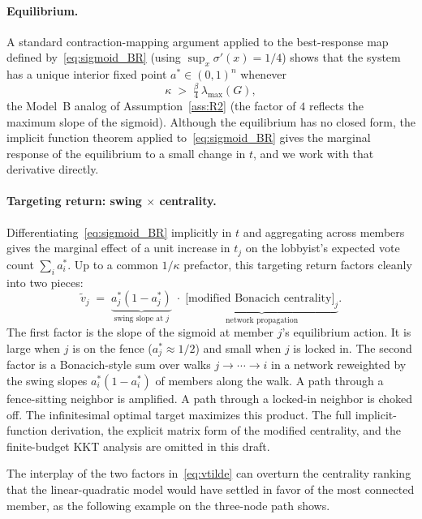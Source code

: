 \documentclass[11pt,letterpaper]{article}
\theoremstyle{plain}
\theoremstyle{definition}
\theoremstyle{remark}
\begin{document}
\paragraph{Equilibrium.} A standard contraction-mapping argument applied to the best-response map defined by~\eqref{eq:sigmoid_BR} (using $\sup_x \sigma'(x) = 1/4$) shows that the system has a unique interior fixed point $a^* \in (0,1)^n$ whenever
\begin{equation}
\kappa \;>\; \tfrac{\beta}{4}\, \lambda_{\max}(G),
\label{eq:spectral_B}
\end{equation}
the Model~B analog of Assumption~\ref{ass:R2} (the factor of $4$ reflects the maximum slope of the sigmoid). Although the equilibrium has no closed form, the implicit function theorem applied to~\eqref{eq:sigmoid_BR} gives the marginal response of the equilibrium to a small change in $t$, and we work with that derivative directly.

\paragraph{Targeting return: swing $\times$ centrality.} Differentiating~\eqref{eq:sigmoid_BR} implicitly in $t$ and aggregating across members gives the marginal effect of a unit increase in $t_j$ on the lobbyist's expected vote count $\sum_i a_i^*$. Up to a common $1/\kappa$ prefactor, this targeting return factors cleanly into two pieces:
\begin{equation}
\tilde v_j \;=\; \underbrace{a_j^*(1 - a_j^*)}_{\text{swing slope at }j} \;\cdot\; \underbrace{\bigl[\text{modified Bonacich centrality}\bigr]_j}_{\text{network propagation}}.
\label{eq:vtilde}
\end{equation}
The first factor is the slope of the sigmoid at member $j$'s equilibrium action. It is large when $j$ is on the fence ($a_j^* \approx 1/2$) and small when $j$ is locked in. The second factor is a Bonacich-style sum over walks $j \to \cdots \to i$ in a network reweighted by the swing slopes $a_i^*(1 - a_i^*)$ of members along the walk. A path through a fence-sitting neighbor is amplified. A path through a locked-in neighbor is choked off. The infinitesimal optimal target maximizes this product. The full implicit-function derivation, the explicit matrix form of the modified centrality, and the finite-budget KKT analysis are omitted in this draft.

The interplay of the two factors in~\eqref{eq:vtilde} can overturn the centrality ranking that the linear-quadratic model would have settled in favor of the most connected member, as the following example on the three-node path shows.
\end{document}
